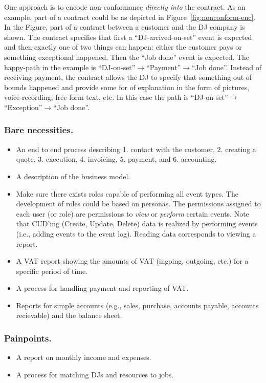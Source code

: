 \documentclass[envcountsame]{llncs}
\begin{document}
\begin{description}
  One approach is to encode non-conformance \emph{directly into} the
  contract. As an example, part of a contract could be as depicted in
  Figure~\ref{fig:nonconform-enc}. In the Figure, part of a contract
  between a customer and the DJ company is shown. The contract
  specifies that first a ``DJ-arrived-on-set'' event is expected and
  then exactly one of two things can happen: either the customer pays
  or something exceptional happened. Then the ``Job done'' event is
  expected. The happy-path in the example is
  ``DJ-on-set''$\rightarrow$``Payment''$\rightarrow$``Job done''.
  Instead of receiving payment, the contract allows the DJ to specify
  that something out of bounds happened and provide some for of
  explanation in the form of pictures, voice-recording, free-form
  text, etc. In this case the path is
  ``DJ-on-set''$\rightarrow$``Exception''$\rightarrow$``Job done''.
\end{description}

\subsubsection{Bare necessities.}
\label{sec:bare-necessities}
\begin{itemize}
\item An end to end process describing 1. contact with the customer,
  2. creating a quote, 3. execution, 4. invoicing, 5. payment, and
  6. accounting.
\item A description of the business model.
\item Make sure there exists roles capable of performing all event
  types. The development of roles could be based on
  personas. The permissions assigned to each user (or
  role) are permissions to \emph{view} or \emph{perform} certain
  events. Note that CUD'ing (Create, Update, Delete) data is realized
  by performing events (i.e., adding events to the event log). Reading
  data corresponds to viewing a report.
\item A VAT report showing the amounts of VAT (ingoing, outgoing,
  etc.) for a specific period of time.
\item A process for handling payment and reporting of VAT.
\item Reports for simple accounts (e.g., sales, purchase, accounts
  payable, accounts recievable) and the balance sheet.
\end{itemize}

\subsubsection{Painpoints.}
\label{sec:painpoints}
\begin{itemize}
\item A report on monthly income and expenses.
\item A process for
  matching DJs and resources to jobs.
\end{itemize}
\end{document}
